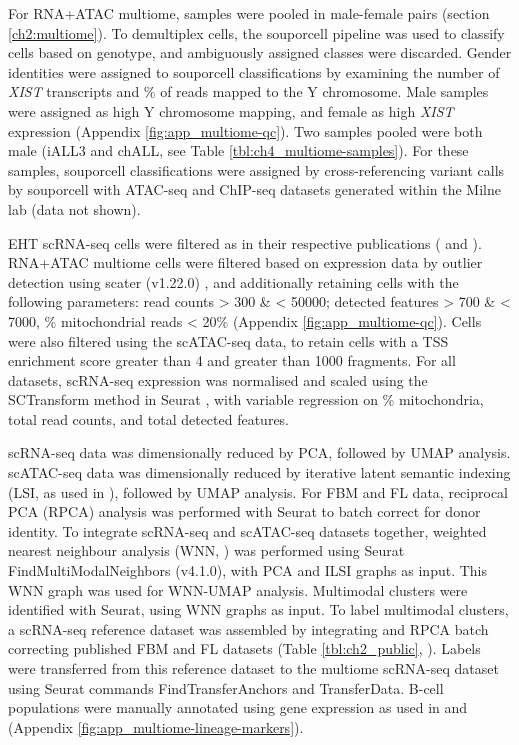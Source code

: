 For RNA+ATAC multiome, samples were pooled in male-female pairs (section \ref{ch2:multiome}). To demultiplex cells, the souporcell pipeline \citep{heaton_souporcell_2020} was used to classify cells based on genotype, and ambiguously assigned classes were discarded. Gender identities were assigned to souporcell classifications by examining the number of \textit{XIST} transcripts and \% of reads mapped to the Y chromosome. Male samples were assigned as high Y chromosome mapping, and female as high \textit{XIST} expression (Appendix \ref{fig:app_multiome-qc}). Two samples pooled were both male (iALL3 and chALL, see Table \ref{tbl:ch4_multiome-samples}). For these samples, souporcell classifications were assigned by cross-referencing variant calls by souporcell with ATAC-seq and ChIP-seq datasets generated within the Milne lab (data not shown).

EHT scRNA-seq cells were filtered as in their respective publications (\cite{zeng_tracing_2019} and \cite{zhu_developmental_2020}). RNA+ATAC multiome cells were filtered based on expression data by outlier detection using scater (v1.22.0) \citep{mccarthy_scater_2017}, and additionally retaining cells with the following parameters: read counts > 300 \& < 50000; detected features > 700 \& < 7000, \% mitochondrial reads < 20\% (Appendix \ref{fig:app_multiome-qc}). Cells were also filtered using the scATAC-seq data, to retain cells with a TSS enrichment score greater than 4 and greater than 1000 fragments. For all datasets, scRNA-seq expression was normalised and scaled using the SCTransform method in Seurat \citep{hafemeister_normalization_2019}, with variable regression on \% mitochondria, total read counts, and total detected features.

scRNA-seq data was dimensionally reduced by PCA, followed by UMAP analysis. scATAC-seq data was dimensionally reduced by iterative latent semantic indexing (LSI, as used in \cite{granja_single-cell_2019, satpathy_massively_2019}), followed by UMAP analysis. For FBM and FL data, reciprocal PCA (RPCA) analysis was performed with Seurat to batch correct for donor identity. To integrate scRNA-seq and scATAC-seq datasets together, weighted nearest neighbour analysis (WNN, \cite{hao_integrated_2021}) was performed using Seurat FindMultiModalNeighbors (v4.1.0), with PCA and ILSI graphs as input. This WNN graph was used for WNN-UMAP analysis. Multimodal clusters were identified with Seurat, using WNN graphs as input. To label multimodal clusters, a scRNA-seq reference dataset was assembled by integrating and RPCA batch correcting published FBM and FL datasets (Table \ref{tbl:ch2_public}, \cite{popescu_decoding_2019, jardine_blood_2021, roy_transitions_2021}). Labels were transferred from this reference dataset to the multiome scRNA-seq dataset using Seurat commands FindTransferAnchors and TransferData. B-cell populations were manually annotated using gene expression as used in \cite{jardine_blood_2021} and \cite{suo_mapping_2022} (Appendix \ref{fig:app_multiome-lineage-markers}).

